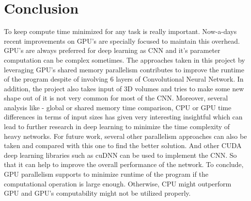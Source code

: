 \documentclass[11pt]{article}       %
\begin{document}
\section{Conclusion} \label{concl}
To keep compute time minimized for any task is really important. Now-a-days recent improvements on GPU's are specially focused to maintain this overhead. GPU's are always preferred for deep learning as CNN and it's parameter computation can be complex sometimes. The approaches taken in this project by leveraging GPU's shared memory parallelism contributes to improve the runtime of the program despite of involving 6 layers of Convolutional Neural Network. In addition, the project also takes input of 3D volumes and tries to make some new shape out of it is not very common for most of the CNN. Moreover, several analysis like - global or shared memory time comparison, CPU or GPU time differences in terms of input sizes has given very interesting insightful which can lead to further research in deep learning to minimize the time complexity  of heavy networks.\newline
For future work, several other parallelism approaches can also be taken and compared with this one to find the better solution. And other CUDA deep learning libraries such as cuDNN can be used to implement the CNN. So that it can help to improve the overall performance of the network. To conclude, GPU parallelism supports to minimize runtime of the program if the computational operation is large enough. Otherwise, CPU might outperform GPU and GPU's computability might not be utilized properly.




\end{document}
